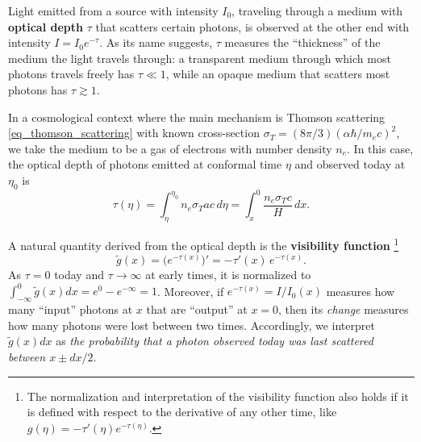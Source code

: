 \documentclass[10pt,a4paper]{article}
\begin{document}
Light emitted from a source with intensity $I_0$,
traveling through a medium with \textbf{optical depth} $\tau$ that scatters certain photons,
is observed at the other end with intensity $I = I_0 e^{-\tau}$.
As its name suggests, $\tau$ measures the ``thickness'' of the medium the light travels through:
a transparent medium through which most photons travels freely has $\tau \ll 1$,
while an opaque medium that scatters most photons has $\tau \gtrsim 1$.

In a cosmological context where the main mechanism is Thomson scattering \eqref{eq_thomson_scattering} with known cross-section $\sigma_T = (8\pi/3) (\alpha \hbar / m_e c)^2$,
we take the medium to be a gas of electrons with number density $n_e$.
In this case, the optical depth of photons emitted at conformal time $\eta$ and observed today at $\eta_0$ is
\begin{equation}
	\tau(\eta) = \int_\eta^{\eta_0} n_e \sigma_T a c \, d\eta = \int_x^0 \frac{n_e \sigma_T c}{H} \, dx.
\label{eq_optical_depth}
\end{equation}

A natural quantity derived from the optical depth is the \textbf{visibility function}%
\footnote{The normalization and interpretation of the visibility function also holds if it is defined with respect to the derivative of any other time, like $g(\eta) = -\tau'(\eta) e^{-\tau(\eta)}$.}
\begin{equation}
	\tilde{g}(x) = \Big( e^{-\tau(x)} \Big)' = -\tau'(x) \, e^{-\tau(x)}.
\label{eq_visibility_function}
\end{equation}
As $\tau=0$ today and $\tau \rightarrow \infty$ at early times,
it is normalized to $\int_{-\infty}^0 \tilde{g}(x) dx = e^0 - e^{-\infty}= 1$.
Moreover, if $e^{-\tau(x)} = I/I_0(x)$ measures how many ``input'' photons at $x$ that are ``output'' at $x=0$,
then its \emph{change} measures how many photons were lost between two times.
Accordingly, we interpret $\tilde{g}(x) dx$ as \emph{the probability that a photon observed today was last scattered between $x \pm dx/2$}.
\end{document}
